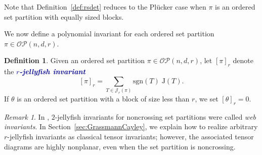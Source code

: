 \documentclass[10pt]{amsart}
\theoremstyle{definition}
\newtheorem{definition}[cdrthm]{Definition}
\theoremstyle{plain}
\theoremstyle{plain}
\theoremstyle{definition}
\theoremstyle{remark}
\newtheorem{remark}[cdrthm]{Remark}
\theoremstyle{plain}
\theoremstyle{plain}
\theoremstyle{plain}
\numberwithin{equation}{section}
\newcommand{\rstab}{\mathcal{J}}
\newcommand{\rspoly}{\mathrm{J}}
\newcommand{\sgn}{\mathrm{sgn}}
\newcommand{\ordsetpart}{\mathcal{OP}}
\newcommand{\newword}[1]{\textcolor{darkblue}{\textbf{\emph{#1}}}}
\begin{document}
Note that Definition~\ref{def:rsdet} reduces to the Pl\"ucker case when $\pi$ is an ordered set partition with equally sized blocks.

We now define a polynomial invariant for each ordered set partition $\pi\in\ordsetpart(n,d,r)$. 

\begin{definition}
\label{def:polynomial}
Given an ordered set partition $\pi\in\ordsetpart(n,d,r)$, let $[\pi]_r$ denote the \newword{$r$-jellyfish invariant} \[
[\pi]_r = \sum_{T\in \rstab_r(\pi)}\sgn(T) \; \rspoly(T).
\]
If $\theta$ is an ordered set partition with a block of size less than $r$, we set $[\theta]_r=0$.
\end{definition}

\begin{remark}
In \cite{Patrias.Pechenik.Striker}, $2$-jellyfish invariants for noncrossing set partitions were called \emph{web invariants}. In Section~\ref{sec:GrassmannCayley}, we explain how to realize arbitrary $r$-jellyfish invariants as classical tensor invariants; however, the associated tensor diagrams are highly nonplanar, even when the set partition is noncrossing.
\end{remark}
\end{document}
